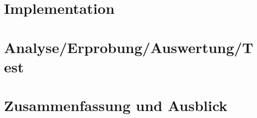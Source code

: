 
\pagestyle{diplHeadings}





\setcounter{page}{1}
\tableofcontents
\cleardoublepage 

\setcounter{page}{1} 
\mainmatter  
{}

 

 





\chapter{Implementation}  %

\chapter{Analyse/Erprobung/Auswertung/Test}

\chapter{Zusammenfassung und Ausblick}



 



